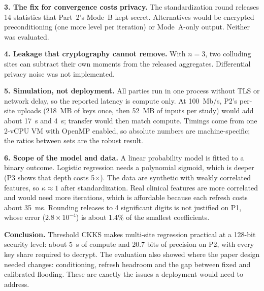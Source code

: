 \documentclass[11pt]{article}
\begin{document}
\textbf{3. The fix for convergence costs privacy.} The standardization round releases 14 statistics that Part~2's Mode~B kept secret. Alternatives would be encrypted preconditioning (one more level per iteration) or Mode~A-only output. Neither was evaluated.

\textbf{4. Leakage that cryptography cannot remove.} With $n=3$, two colluding sites can subtract their own moments from the released aggregates. Differential privacy noise was not implemented.

\textbf{5. Simulation, not deployment.} All parties run in one process without TLS or network delay, so the reported latency is compute only. At 100~Mb/s, P2's per-site uploads (218~MB of keys once, then 52~MB of inputs per study) would add about 17~s and 4~s; transfer would then match compute. Timings come from one 2-vCPU VM with OpenMP enabled, so absolute numbers are machine-specific; the ratios between sets are the robust result.

\textbf{6. Scope of the model and data.} A linear probability model is fitted to a binary outcome. Logistic regression needs a polynomial sigmoid, which is deeper (P3 shows that depth costs 5$\times$). The data are synthetic with weakly correlated features, so $\kappa\approx1$ after standardization. Real clinical features are more correlated and would need more iterations, which is affordable because each refresh costs about 35~ms. Rounding releases to 4 significant digits is not justified on P1, whose error ($2.8\times10^{-4}$) is about 1.4\% of the smallest coefficients.

\textbf{Conclusion.} Threshold CKKS makes multi-site regression practical at a 128-bit security level: about 5~s of compute and 20.7 bits of precision on P2, with every key share required to decrypt. The evaluation also showed where the paper design needed changes: conditioning, refresh headroom and the gap between fixed and calibrated flooding. These are exactly the issues a deployment would need to address.
\end{document}
